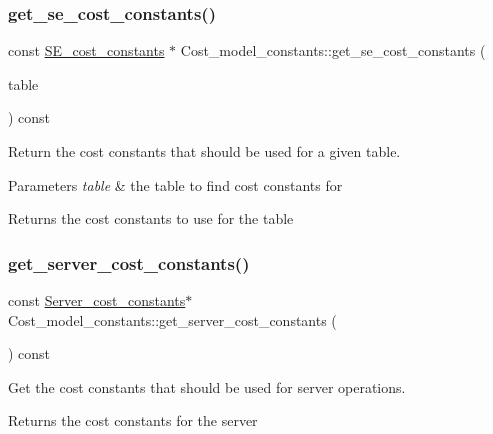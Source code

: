 \subsubsection{\texorpdfstring{get\+\_\+se\+\_\+cost\+\_\+constants()}{get\_se\_cost\_constants()}}
{\footnotesize\ttfamily const \mbox{\hyperlink{classSE__cost__constants}{S\+E\+\_\+cost\+\_\+constants}} $\ast$ Cost\+\_\+model\+\_\+constants\+::get\+\_\+se\+\_\+cost\+\_\+constants (\begin{DoxyParamCaption}\item[{const \mbox{\hyperlink{structTABLE}{T\+A\+B\+LE}} $\ast$}]{table }\end{DoxyParamCaption}) const}

Return the cost constants that should be used for a given table.


\begin{DoxyParams}{Parameters}
{\em table} & the table to find cost constants for\\
\hline
\end{DoxyParams}
\begin{DoxyReturn}{Returns}
the cost constants to use for the table 
\end{DoxyReturn}
\mbox{\label{classCost__model__constants_a745af7d6aac2594b6af661dca118d135}} 
\subsubsection{\texorpdfstring{get\+\_\+server\+\_\+cost\+\_\+constants()}{get\_server\_cost\_constants()}}
{\footnotesize\ttfamily const \mbox{\hyperlink{classServer__cost__constants}{Server\+\_\+cost\+\_\+constants}}$\ast$ Cost\+\_\+model\+\_\+constants\+::get\+\_\+server\+\_\+cost\+\_\+constants (\begin{DoxyParamCaption}{ }\end{DoxyParamCaption}) const\hspace{0.3cm}{\ttfamily [inline]}}

Get the cost constants that should be used for server operations.

\begin{DoxyReturn}{Returns}
the cost constants for the server 
\end{DoxyReturn}
\mbox{\label{classCost__model__constants_ad55e6fc13b0e831511c5ee0a9b46fdfb}} 
